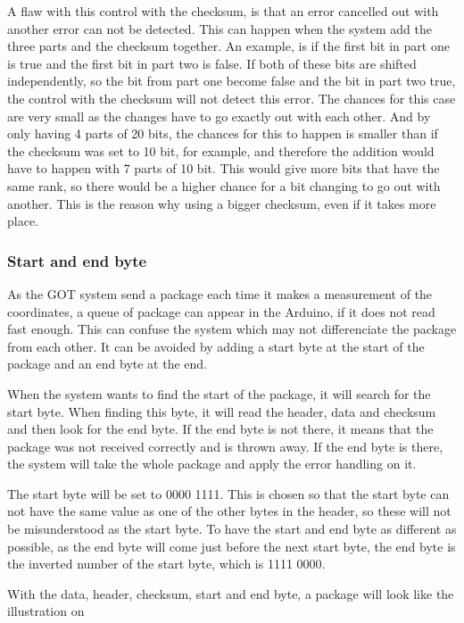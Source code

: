 A flaw with this control with the checksum, is that an error cancelled out with another error can not be detected. This can happen when the system add the three parts and the checksum together. An example, is if the first bit in part one is true and the first bit in part two is false. If both of these bits are shifted independently, so the bit from part one become false and the bit in part two true, the control with the checksum will not detect this error. The chances for this case are very small as the changes have to go exactly out with each other. And by only having 4 parts of 20 bits, the chances for this to happen is smaller than if the checksum was set to 10 bit, for example, and therefore the addition would have to happen with 7 parts of 10 bit. This would give more bits that have the same rank, so there would be a higher chance for a bit changing to go out with another. This is the reason why using a bigger checksum, even if it takes more place.

\subsubsection{Start and end byte}

As the GOT system send a package each time it makes a measurement of the coordinates, a queue of package can appear in the Arduino, if it does not read fast enough. This can confuse the system which may not differenciate the package from each other. It can be avoided by adding a start byte at the start of the package and an end byte at the end. 

When the system wants to find the start of the package, it will search for the start byte. When finding this byte, it will read the header, data and checksum and then look for the end byte. If the end byte is not there, it means that the package was not received correctly and is thrown away. If the end byte is there, the system will take the whole package and apply the error handling on it. 

The start byte will be set to 0000 1111. This is chosen so that the start byte can not have the same value as one of the other bytes in the header, so these will not be misunderstood as the start byte. To have the start and end byte as different as possible, as the end byte will come just before the next start byte, the end byte is the inverted number of the start byte, which is 1111 0000.


With the data, header, checksum, start and end byte, a package will look like the illustration on 

